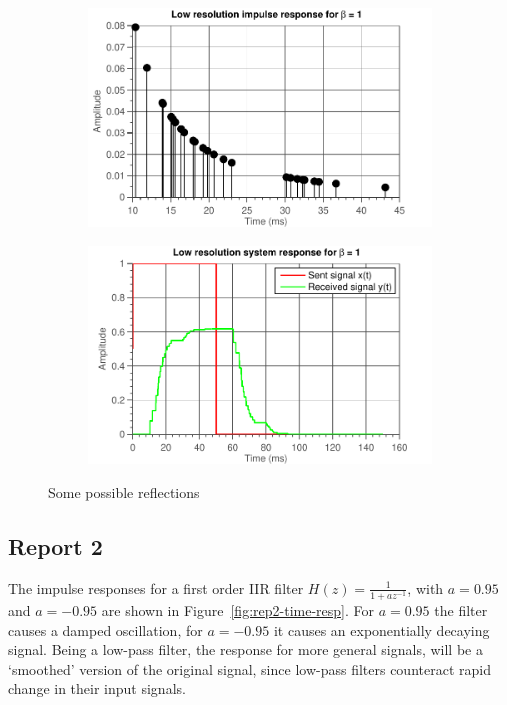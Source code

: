 \documentclass[11pt,titlepage]{report}
\begin{document}
\begin{figure}[H]
	\centering
	\begin{subfigure}{0.49\textwidth}
		\includegraphics[width=\textwidth]{resource/ass-1-report-1-impulse-response-2-copies-beta-1.pdf}
	\end{subfigure}
	\begin{subfigure}{0.49\textwidth}
		\includegraphics[width=\textwidth]{resource/ass-1-report-1-system-response-2-copies-beta-1.pdf}
	\end{subfigure}
	\caption{Some possible reflections}
	\label{fig:rep1-reflections-matlab}
\end{figure}

\subsection{Report 2}
The impulse responses for a first order IIR filter $H(z) = \frac{1}{1+az^{-1}}$, with $a=0.95$ and $a=-0.95$ are shown in Figure~\ref{fig:rep2-time-resp}. For $a=0.95$ the filter causes a damped oscillation, for $a=-0.95$ it causes an exponentially decaying signal. Being a low-pass filter, the response for more general signals, will be a `smoothed' version of the original signal, since low-pass filters counteract rapid change in their input signals. %
\end{document}
